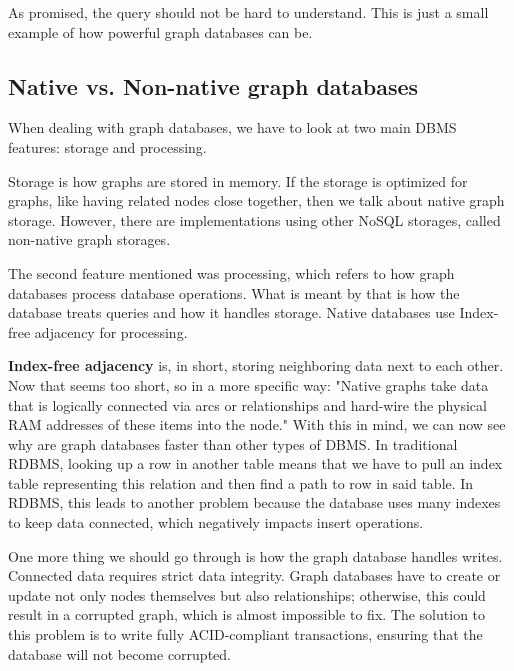 
As promised, the query should not be hard to understand. This is just a small example of how powerful graph databases can be.

\subsection {Native vs. Non-native graph databases}

When dealing with graph databases, we have to look at two main DBMS features: storage and processing.

Storage is how graphs are stored in memory. If the storage is optimized for graphs, like having related nodes close together, then we talk about native graph storage. However, there are implementations using other NoSQL storages, called non-native graph storages.

The second feature mentioned was processing, which refers to how graph databases process database operations. What is meant by that is how the database treats queries and how it handles storage. Native databases use Index-free adjacency for processing.

\textbf{Index-free adjacency} is, in short, storing neighboring data next to each other. Now that seems too short, so in a more specific way:
"Native graphs take data that is logically connected via arcs or relationships and hard-wire the physical RAM addresses of these items into the node."
\cite{mccreary_neighborhood_2021} With this in mind, we can now see why are graph databases faster than other types of DBMS.
In traditional RDBMS, looking up a row in another table means that we have to pull an index table representing this relation and then find a path to row in said table.
In RDBMS, this leads to another problem because the database uses many indexes to keep data connected, which negatively impacts insert operations.

One more thing we should go through is how the graph database handles writes. Connected data requires strict data integrity.
Graph databases have to create or update not only nodes themselves but also relationships; otherwise, this could result in a corrupted graph, which is almost impossible to fix.
The solution to this problem is to write fully ACID-compliant transactions, ensuring that the database will not become corrupted.

